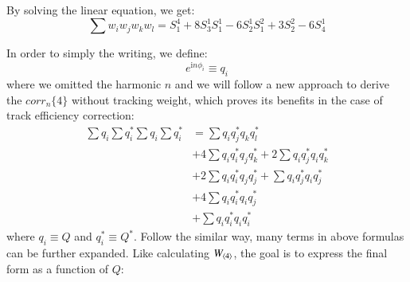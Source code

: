 By solving the linear equation, we get:
\begin{equation}
\sum w_{i}w_{j}w_{k}w_{l} = S_{1}^{4}+8S_{3}^{1}S_{1}^{1}-6S_{2}^{1}S_{1}^{2}+3S_{2}^{2}-6S_{4}^{1}
\end{equation}

In order to simply the writing, we define:
\begin{equation}
e^{\text{i}n\phi_{i}}\equiv q_{i}
\end{equation}
where we omitted the harmonic $n$ and we will follow a new approach to derive the $corr_{n}\{4\}$ without tracking weight, which proves its benefits in the case of track efficiency correction:
\begin{equation}
\begin{split}
\sum q_{i}^{}\sum q_{i}^{*}\sum q_{i}^{}\sum q_{i}^{*}&=\sum q_{i}^{}q_{j}^{*}q_{k}^{}q_{l}^{*} \\
&+4\sum q_{i}^{}q_{i}^{*}q_{j}^{}q_{k}^{*}+2\sum q_{i}^{}q_{j}^{*}q_{i}^{}q_{k}^{*} \\
&+2\sum q_{i}^{}q_{i}^{*}q_{j}^{}q_{j}^{*}+\sum q_{i}^{}q_{j}^{*}q_{i}^{}q_{j}^{*} \\
&+4\sum q_{i}^{}q_{i}^{*}q_{i}^{}q_{j}^{*} \\
&+\sum q_{i}^{}q_{i}^{*}q_{i}^{}q_{i}^{*}
\end{split}
\end{equation}
where $q_{i}^{}\equiv Q$ and $q_{i}^{*}\equiv Q^{*}$. Follow the similar way, many terms in above formulas can be further expanded. Like calculating $W_{\left\langle 4\right\rangle}$, the goal is to express the final form as a function of $Q$:
